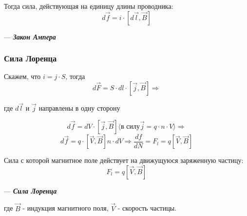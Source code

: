 \documentclass[../main.tex]{subfiles}
\begin{document}
Тогда сила, действующая на единицу длины проводника:
\[d \vec f = i \cdot [d \vec l, \vec B]\]
\begin{center}
    --- \textit{\textbf{Закон Ампера}}
\end{center}
\subsubsection{Сила Лоренца}

Скажем, что $i = j \cdot S$, тогда
\[d \vec F = S \cdot dl \cdot [\vec j, \vec B] \Rightarrow\]
\begin{center}
    где $d \vec l$ и $ \vec j$ направлены в одну сторону
\end{center}
\[d \vec f = dV \cdot [\vec j, \vec B] \langle \text{в силу} \vec j = q \cdot n \cdot V \rangle \Rightarrow \]
\[d \vec f = q \cdot [\vec V, \vec B] n \cdot dV \Rightarrow \frac{df}{dN} = F_l = q[\vec V, \vec B]\]

Сила с которой магнитное поле действует на движущуюся заряженную частицу:
\[F_l = q[\vec V, \vec B]\]
\begin{center}
    --- \textit{\textbf{Сила Лоренца}}
\end{center}

где $\vec B$ - индукция магнитного поля, $\vec V$ - скорость частицы.
\end{document}
